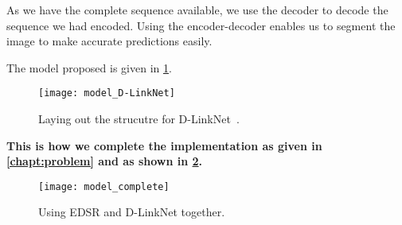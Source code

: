 As we have the complete sequence available, we use the decoder to decode the sequence we had encoded. Using the encoder-decoder enables us to segment the image to make accurate predictions easily.

The model proposed is given in \cref{fig:model_D-LinkNet}.
\begin{figure}[h!]
  \centering
  \texttt{[image: model\_D-LinkNet]}
  \caption[Laying out the strucutre for D-LinkNet]{Laying out the strucutre for D-LinkNet~\cite{D-LinkNet}.}
  \label{fig:model_D-LinkNet}
\end{figure}


\textbf{This is how we complete the implementation as given in \cref{chapt:problem} and as shown in \cref{fig:model_complete}.}

\begin{figure}[h!]
  \centering
  \texttt{[image: model\_complete]}
  \caption{Using EDSR and D-LinkNet together.}
  \label{fig:model_complete}
\end{figure}